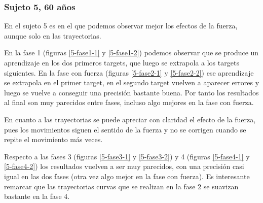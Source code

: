\documentclass[a4paper,11pt, oneside]{book}
\begin{document}
\subsubsection{Sujeto 5, 60 años}

En el sujeto 5 es en el que podemos observar mejor los efectos de la fuerza, aunque solo en las trayectorias.

En la fase 1 (figuras \ref{5-fase1-1} y \ref{5-fase1-2}) podemos observar que se produce un aprendizaje en los dos primeros targets, que luego se extrapola a los targets siguientes. En la fase con fuerza (figuras \ref{5-fase2-1} y \ref{5-fase2-2}) ese aprendizaje se extrapola en el primer target, en el segundo target vuelven a aparecer errores y luego se vuelve a conseguir una precisión bastante buena. Por tanto los resultados al final son muy parecidos entre fases, incluso algo mejores en la fase con fuerza. 

En cuanto a las trayectorias se puede apreciar con claridad el efecto de la fuerza, pues los movimientos siguen el sentido de la fuerza y no se corrigen cuando se repite el movimiento más veces.

Respecto a las fases 3 (figuras \ref{5-fase3-1} y \ref{5-fase3-2}) y 4 (figuras \ref{5-fase4-1} y \ref{5-fase4-2}) los resultados vuelven a ser muy parecidos, con una precisión casi igual en las dos fases (otra vez algo mejor en la fase con fuerza). Es interesante remarcar que las trayectorias curvas que se realizan en la fase 2 se suavizan bastante en la fase 4. 
\end{document}
